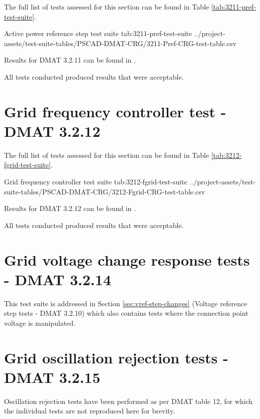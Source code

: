 \documentclass{../grid-link-report}
\newcommand{\projectassetsdir}{../project-assets}
\begin{document}
	
	
	
	
	The full list of tests assessed for this section can be found in Table \ref{tab:3211-pref-test-suite}.
	
	{
		\fontsize{6}{8}\selectfont
		\autoscaledlongtable
		{Active power reference step test suite}
		{tab:3211-pref-test-suite}
		{\projectassetsdir/test-suite-tables/PSCAD-DMAT-CRG/3211-Pref-CRG-test-table.csv}
	}
	
	Results for DMAT 3.2.11 can be found in .
	
	All tests conducted produced results that were acceptable.
	
	
	\section{Grid frequency controller test - DMAT 3.2.12}		
	
	
	
	
	The full list of tests assessed for this section can be found in Table \ref{tab:3212-fgrid-test-suite}.
	
	{
		\fontsize{7}{9}\selectfont
		\autoscaledlongtable
		{Grid frequency controller test suite}
		{tab:3212-fgrid-test-suite}
		{\projectassetsdir/test-suite-tables/PSCAD-DMAT-CRG/3212-Fgrid-CRG-test-table.csv}
	}
	
	Results for DMAT 3.2.12 can be found in .	
	
	All tests conducted produced results that were acceptable.
	
	
	\section{Grid voltage change response tests - DMAT 3.2.14}		
	
	
	This test suite is addressed in Section \ref{sec:vref-step-changes} (Voltage reference step tests - DMAT 3.2.10) which also contains tests where the connection point voltage is manipulated.
	
	\section{Grid oscillation rejection tests - DMAT 3.2.15}
	
	Oscillation rejection tests have been performed as per DMAT table 12, for which the individual tests are not reproduced here for brevity.
	
\end{document}
